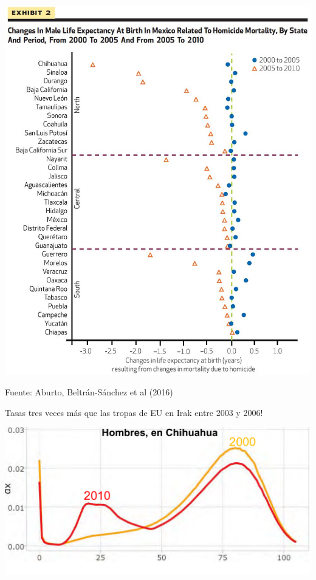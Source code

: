 \documentclass[xcolor={dvipsnames}]{beamer}
\begin{document}
\begin{frame}
\begin{center}
		\includegraphics[scale=.24]{Figures/Fig4}
				\end{center}			
								\tiny{Fuente: Aburto, Beltr\'an-S\'anchez et al (2016)}
		

\end{frame}


\begin{frame}

\Large{
Tasas tres veces m\'as que las tropas de EU en Irak entre 2003 y 2006!
				\begin{center}
		\includegraphics[scale=.45]{Figures/Distr_chihuahua}
				\end{center}				

}
\end{frame}
\end{document}
